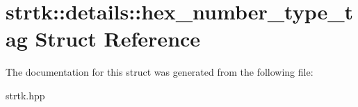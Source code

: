 \hypertarget{structstrtk_1_1details_1_1hex__number__type__tag}{\section{strtk\-:\-:details\-:\-:hex\-\_\-number\-\_\-type\-\_\-tag Struct Reference}
\label{structstrtk_1_1details_1_1hex__number__type__tag}
}


The documentation for this struct was generated from the following file\-:\begin{DoxyCompactItemize}
\item 
strtk.\-hpp\end{DoxyCompactItemize}
